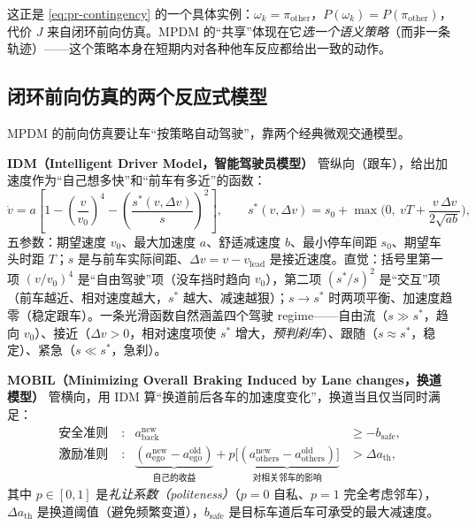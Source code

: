 这正是 \cref{eq:pr-contingency} 的一个具体实例：$\omega_k=\pi_{\mathrm{other}}$，$P(\omega_k)=P(\pi_{\mathrm{other}})$，代价 $J$ 来自闭环前向仿真。MPDM 的“共享”体现在它\emph{选一个语义策略}（而非一条轨迹）——这个策略本身在短期内对各种他车反应都给出一致的动作。

\subsection{闭环前向仿真的两个反应式模型}
\label{sec:pr-mpdm-models}

MPDM 的前向仿真要让车“按策略自动驾驶”，靠两个经典微观交通模型。

\textbf{IDM（Intelligent Driver Model，智能驾驶员模型）}\cite{treiber2000idm} 管纵向（跟车），给出加速度作为“自己想多快”和“前车有多近”的函数：
\begin{equation}
  \dot v = a\left[1-\left(\frac{v}{v_0}\right)^{4}-\left(\frac{s^*(v,\Delta v)}{s}\right)^{2}\right],
  \qquad
  s^*(v,\Delta v)=s_0+\max\!\Big(0,\ vT+\frac{v\,\Delta v}{2\sqrt{ab}}\Big),
  \label{eq:pr-idm}
\end{equation}
五参数：期望速度 $v_0$、最大加速度 $a$、舒适减速度 $b$、最小停车间距 $s_0$、期望车头时距 $T$；$s$ 是与前车实际间距、$\Delta v=v-v_{\mathrm{lead}}$ 是接近速度。直觉：括号里第一项 $(v/v_0)^4$ 是“自由驾驶”项（没车挡时趋向 $v_0$），第二项 $(s^*/s)^2$ 是“交互”项（前车越近、相对速度越大，$s^*$ 越大、减速越狠）；$s\to s^*$ 时两项平衡、加速度趋零（稳定跟车）。一条光滑函数自然涵盖四个驾驶 regime——自由流（$s\gg s^*$，趋向 $v_0$）、接近（$\Delta v>0$，相对速度项使 $s^*$ 增大，\emph{预判刹车}）、跟随（$s\approx s^*$，稳定）、紧急（$s\ll s^*$，急刹）。

\textbf{MOBIL（Minimizing Overall Braking Induced by Lane changes，换道模型）}\cite{kesting2007mobil} 管横向，用 IDM 算“换道前后各车的加速度变化”，换道当且仅当同时满足：
\begin{align}
  \text{安全准则}\;&: & a^{\mathrm{new}}_{\mathrm{back}}&\ge -b_{\mathrm{safe}}, \label{eq:pr-mobil-safe}\\
  \text{激励准则}\;&: & \underbrace{(a^{\mathrm{new}}_{\mathrm{ego}}-a^{\mathrm{old}}_{\mathrm{ego}})}_{\text{自己的收益}}+p\underbrace{\big[(a^{\mathrm{new}}_{\mathrm{others}}-a^{\mathrm{old}}_{\mathrm{others}})\big]}_{\text{对相关邻车的影响}}&>\Delta a_{\mathrm{th}}, \label{eq:pr-mobil-incentive}
\end{align}
其中 $p\in[0,1]$ 是\emph{礼让系数（politeness）}（$p=0$ 自私、$p=1$ 完全考虑邻车），$\Delta a_{\mathrm{th}}$ 是换道阈值（避免频繁变道），$b_{\mathrm{safe}}$ 是目标车道后车可承受的最大减速度。

